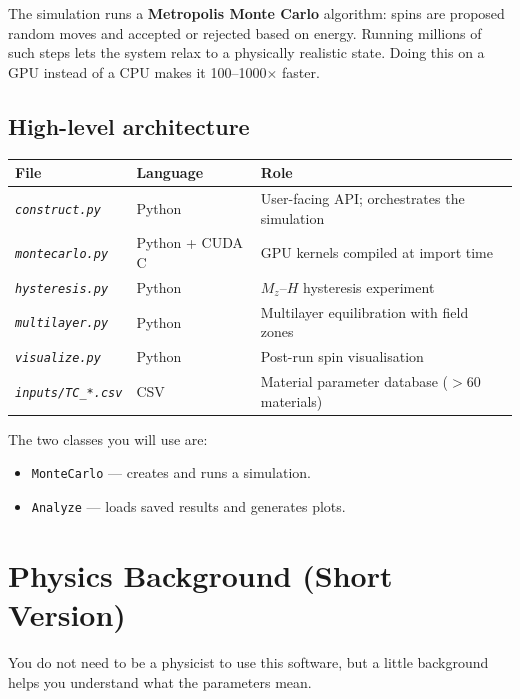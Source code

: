 \documentclass[12pt,a4paper]{article}
\newcommand{\code}[1]{\texttt{#1}}
\newcommand{\file}[1]{\texttt{\textit{#1}}}
\begin{document}
The simulation runs a \textbf{Metropolis Monte Carlo} algorithm: spins are
proposed random moves and accepted or rejected based on energy. Running
millions of such steps lets the system relax to a physically realistic state.
Doing this on a GPU instead of a CPU makes it 100--1000$\times$ faster.

\subsection{High-level architecture}

\begin{center}
\begin{tabular}{lll}
\toprule
\textbf{File} & \textbf{Language} & \textbf{Role} \\
\midrule
\file{construct.py} & Python & User-facing API; orchestrates the simulation \\
\file{montecarlo.py} & Python + CUDA C & GPU kernels compiled at import time \\
\file{hysteresis.py} & Python & $M_z$--$H$ hysteresis experiment \\
\file{multilayer.py} & Python & Multilayer equilibration with field zones \\
\file{visualize.py} & Python & Post-run spin visualisation \\
\file{inputs/TC\_*.csv} & CSV & Material parameter database ($>$60 materials) \\
\bottomrule
\end{tabular}
\end{center}

The two classes you will use are:
\begin{itemize}
  \item \code{MonteCarlo} --- creates and runs a simulation.
  \item \code{Analyze} --- loads saved results and generates plots.
\end{itemize}

\section{Physics Background (Short Version)}

You do not need to be a physicist to use this software, but a little
background helps you understand what the parameters mean.
\end{document}
